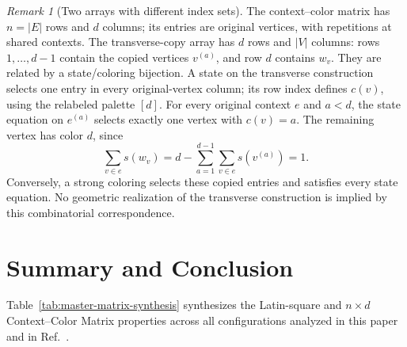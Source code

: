 \documentclass[aps,pra,reprint,superscriptaddress,longbibliography,nofootinbib,floatfix,10pt]{revtex4-2}
\theoremstyle{definition}\newtheorem{definition}[theorem]{Definition}
\theoremstyle{remark}\newtheorem{remark}[theorem]{Remark}
\begin{document}
\begin{remark}[Two arrays with different index sets]\label{rem:two-arrays}
The context--color matrix has $n=|E|$ rows and $d$ columns; its entries are original vertices, with repetitions at shared contexts. The transverse-copy array has $d$ rows and $|V|$ columns: rows $1,\ldots,d-1$ contain the copied vertices $v^{(a)}$, and row $d$ contains $w_v$. They are related by a state/coloring bijection. A state on the transverse construction selects one entry in every original-vertex column; its row index defines $c(v)$, using the relabeled palette $[d]$. For every original context $e$ and $a<d$, the state equation on $e^{(a)}$ selects exactly one vertex with $c(v)=a$. The remaining vertex has color $d$, since
\[
\sum_{v\in e}s(w_v)=d-\sum_{a=1}^{d-1}\sum_{v\in e}s(v^{(a)})=1.
\]
Conversely, a strong coloring selects these copied entries and satisfies every state equation. No geometric realization of the transverse construction is implied by this combinatorial correspondence.
\end{remark}

\section{Summary and Conclusion}\label{sec:conclusion}

Table~\ref{tab:master-matrix-synthesis} synthesizes the Latin-square and $n\times d$ Context--Color Matrix properties across all configurations analyzed in this paper and in Ref.~\cite{svozil2026contexts}.
\end{document}
